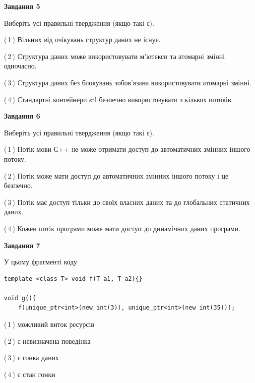 \documentclass[12pt, ukrainian]{article}
\begin{document}
\begin {large}
{\begin{center}
\textbf{Завдання 5}
\end{center}

Виберіть усі правильні твердження (якщо такі є).\par
\vspace{2mm}

(\,1\,) Вільних від очікувань структур даних не існує.%

(\,2\,) Структура даних може використовувати м’ютекси та атомарні змінні одночасно.%

(\,3\,) Структура даних без блокувань зобов’язана використовувати атомарні змінні.%

(\,4\,) Стандартні контейнери stl безпечно використовувати з кількох потоків.%
\newpage


\begin{center}
\textbf{Завдання 6}
\end{center}

Виберіть усі правильні твердження (якщо такі є).\par
\vspace{2mm}

(\,1\,) Потік мови С++ не може отримати доступ до автоматичних змінних іншого потоку.%

(\,2\,) Потік може мати доступ до автоматичних змінних іншого потоку і це безпечно.%

(\,3\,) Потік має доступ тільки до своїх власних даних та до глобальних статичних даних.%

(\,4\,) Кожен потік програми може мати доступ до динамічних даних програми.%


\begin{center}
\textbf{Завдання 7}
\end{center}

У цьому фрагменті коду
\begin{verbatim}
template <class T> void f(T a1, T a2){}

void g(){
    f(unique_ptr<int>(new int(3)), unique_ptr<int>(new int(35)));
\end{verbatim}

(\,1\,) можливий виток ресурсів%

(\,2\,) є невизначена поведінка%

(\,3\,) є гонка даних%

(\,4\,) є стан гонки%

}
\end {large}

\vspace{4mm}
\newpage
\end{document}
